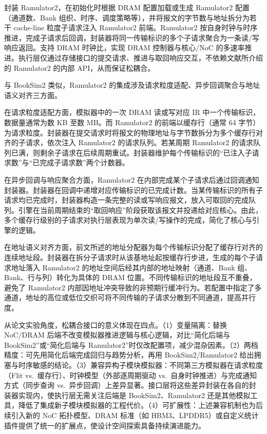 封装 Ramulator2，在初始化时根据 DRAM 配置加载或生成 Ramulator2 配置（通道数、Bank 组织、时序、调度策略等），并将报文的字节数与地址拆分为若干 cache-line 粒度子请求注入 Ramulator2 前端。Ramulator2 按自身时钟与时序推进，完成子请求后回调，封装器将同一传输标识的多个子请求聚合为一条读/写响应返回。支持 DRAM 时钟比，实现 DRAM 控制器与核心/NoC 的多速率推进。执行层仅通过存储接口的提交请求、推进与取回响应交互，不依赖文献\parencite{luo2023ramulator2}所介绍的 Ramulator2 的内部 API，从而保证松耦合。

与 BookSim2 类似，Ramulator2 的集成涉及请求粒度适配、异步回调聚合与地址语义对齐三方面。

在请求粒度适配方面，模拟器中的一次 DRAM 读或写对应 IR 中一个传输标识，数据量通常为数 KB 至数 MB。而 Ramulator2 的前端以缓存行（通常 64 字节）为请求粒度。封装器在提交请求时将报文的物理地址与字节数拆分为多个缓存行对齐的子请求，依次注入 Ramulator2 的请求队列。若某周期 Ramulator2 的请求队列已满，则剩余子请求在后续周期重试。封装器维护每个传输标识的“已注入子请求数”与“已完成子请求数”两个计数器。

在异步回调与响应聚合方面，Ramulator2 在内部完成某个子请求后通过回调通知封装器。封装器在回调中递增对应传输标识的已完成计数。当某传输标识的所有子请求均已完成时，封装器构造一条完整的读或写响应报文，放入可取回的完成队列。引擎在当前周期结束的“取回响应”阶段获取该报文并投递给对应核心。由此，多个缓存行级别的子请求对执行层表现为单次读/写操作的完成，简化了核心与引擎的逻辑。

在地址语义对齐方面，前文所述的地址分配器为每个传输标识分配了缓存行对齐的连续地址段。封装器在拆分子请求时从该基地址起按缓存行步进，生成的每个子请求地址落入 Ramulator2 的地址空间后经其内部的地址映射（通道、Bank 组、Bank、行与列）转化为具体的 DRAM 位置。不同传输标识的地址段互不重叠，避免了 Ramulator2 内部因地址冲突导致的非预期行缓冲行为。若配置中指定了多通道，地址的高位或低位交织可将不同传输的子请求分散到不同通道，提高并行度。


从论文实验角度，松耦合接口的意义体现在四点。（1）变量隔离：替换 NoC/DRAM 后端不改变模拟器推进逻辑与核心逻辑，对比“简化后端与 BookSim2”或“简化后端与 Ramulator2”时仅改配置项，减少混杂因素。（2）两档精度：可先用简化后端完成回归与趋势分析，再用 BookSim2/Ramulator2 给出拥塞与时序敏感的结论。（3）兼容异构子模块模拟器：不同第三方模拟器在请求粒度（Flit vs.\ 缓存行）、时钟模型（外部逐周期驱动 vs.\ 自身时钟推进）与完成通知方式（同步查询 vs.\ 异步回调）上差异显著。接口层将这些差异封装在各自的封装器实现内，使执行层无需关注后端是 BookSim2、Ramulator2 还是其他模拟工具，降低了集成新子模块模拟器的工程代价。（4）可扩展性：上述兼容机制也为后续引入新的 NoC 拓扑模型、DRAM 标准（如 HBM3、LPDDR5）或自定义统计插件提供了统一的扩展点，使设计空间探索具备持续演进能力。

